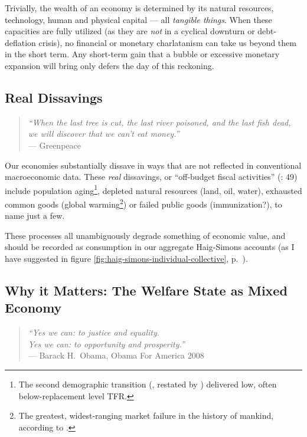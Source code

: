 Trivially, the wealth of an economy is determined by its natural resources, technology, human and physical capital --- all \emph{tangible things}. When these capacities are fully utilized (as they are \emph{not} in a cyclical downturn or debt-deflation crisis), no financial or monetary charlatanism can take us beyond them in the short term. Any short-term gain that a bubble or excessive monetary expansion will bring only defers the day of this reckoning.

\subsection{Real Dissavings} \label{sec:realdissavings}

\begin{quote}
	\emph{``When the last tree is cut, the last river poisoned, and the last fish dead, we will discover that we can't eat money.''\\}
	--- Greenpeace
\end{quote}

Our economies substantially dissave in ways that are not reflected in conventional macroeconomic data. These \emph{real} dissavings, or ``off-budget fiscal activities'' (\citealt{Bonker2006}: 49) include population aging\footnote{
	The second demographic transition (\citealt{Davis1945}, restated by \citealt{Caldwell-1976-aa}) delivered low, often below-replacement level \gls{TFR}.},
depleted natural resources (land, oil, water), exhausted common goods (global warming\footnote{
	The greatest, widest-ranging market failure in the history of mankind, according to \cite{Stern-2006-aa}.})
or failed public goods (immunization?), to name just a few.

These processes all unambiguously degrade something of economic value, and should be recorded as consumption in our aggregate Haig-Simons accounts (as I have suggested in figure \ref{fig:haig-simons-individual-collective}, p.~\pageref{fig:haig-simons-individual-collective}). %

\subsection[Why it Matters]{Why it Matters: The Welfare State as Mixed Economy} \label{sec:why-mixed-economy-matters}

\begin{quote}
	\emph{``Yes we can: to justice and equality.\\ Yes we can: to opportunity and prosperity.''\\}
	--- Barack H.\ Obama, Obama For America 2008
\end{quote} %

